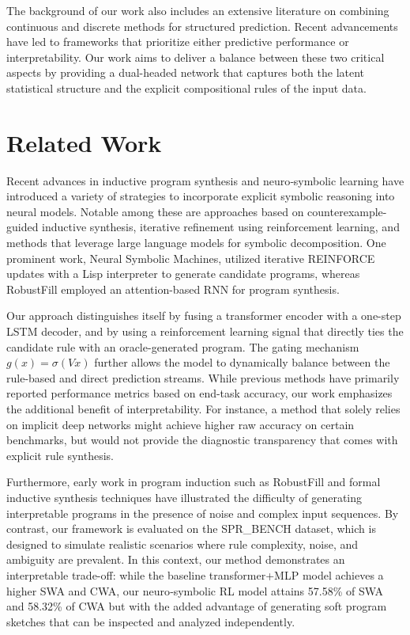 \documentclass{article}
\begin{document}
The background of our work also includes an extensive literature on combining continuous and discrete methods for structured prediction. Recent advancements have led to frameworks that prioritize either predictive performance or interpretability. Our work aims to deliver a balance between these two critical aspects by providing a dual-headed network that captures both the latent statistical structure and the explicit compositional rules of the input data.

\section{Related Work}
Recent advances in inductive program synthesis and neuro‐symbolic learning have introduced a variety of strategies to incorporate explicit symbolic reasoning into neural models. Notable among these are approaches based on counterexample-guided inductive synthesis, iterative refinement using reinforcement learning, and methods that leverage large language models for symbolic decomposition. One prominent work, Neural Symbolic Machines, utilized iterative REINFORCE updates with a Lisp interpreter to generate candidate programs, whereas RobustFill employed an attention-based RNN for program synthesis.

Our approach distinguishes itself by fusing a transformer encoder with a one-step LSTM decoder, and by using a reinforcement learning signal that directly ties the candidate rule with an oracle-generated program. The gating mechanism \( g(x)=\sigma(Vx) \) further allows the model to dynamically balance between the rule-based and direct prediction streams. While previous methods have primarily reported performance metrics based on end-task accuracy, our work emphasizes the additional benefit of interpretability. For instance, a method that solely relies on implicit deep networks might achieve higher raw accuracy on certain benchmarks, but would not provide the diagnostic transparency that comes with explicit rule synthesis.

Furthermore, early work in program induction such as RobustFill and formal inductive synthesis techniques have illustrated the difficulty of generating interpretable programs in the presence of noise and complex input sequences. By contrast, our framework is evaluated on the SPR\_BENCH dataset, which is designed to simulate realistic scenarios where rule complexity, noise, and ambiguity are prevalent. In this context, our method demonstrates an interpretable trade-off: while the baseline transformer+MLP model achieves a higher SWA and CWA, our neuro‐symbolic RL model attains 57.58\% of SWA and 58.32\% of CWA but with the added advantage of generating soft program sketches that can be inspected and analyzed independently.
\end{document}
